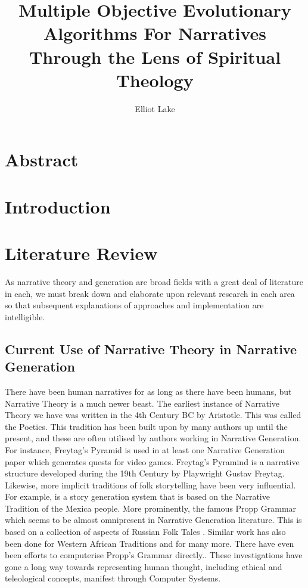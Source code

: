 \documentclass[12pt]{article}
\author{Elliot Lake}
\title{Multiple Objective Evolutionary Algorithms For Narratives Through the Lens of Spiritual Theology}
\begin{document}
\maketitle

\section{Abstract}

\section{Introduction}

\section{Literature Review}
As narrative theory and generation are broad fields with a great deal of literature in each, we must break down and elaborate upon relevant research in each area so that subsequent explanations of approaches and implementation are intelligible.

\subsection{Current Use of Narrative Theory in Narrative Generation}
There have been human narratives for as long as there have been humans, but Narrative Theory is a much newer beast. The earliest instance of Narrative Theory we have was written in the 4th Century BC by Aristotle. This was called the Poetics. This tradition has been built upon by many authors up until the present, and these are often utilised by authors working in Narrative Generation.  For instance, Freytag's Pyramid is used in at least one Narrative Generation paper which generates quests for video games\cite{questgeneration}.  Freytag's Pyramind is a narrative structure developed during the 19th Century by Playwright Gustav Freytag. Likewise, more implicit traditions of folk storytelling have been very influential. For example, \cite{MEXICA} is a story generation system that is based on the Narrative Tradition of the Mexica people. More prominently, the famous Propp Grammar which seems to be almost omnipresent in Narrative Generation literature. This is based on a collection of aspects of Russian Folk Tales \cite{propp1975morphology}. Similar work has also been done for Western African Traditions \cite{WestAfricanGeneration} and for many more.  There have even been efforts to computerise Propp's Grammar directly.\cite{Gervs2013ProppsMO}. These investigations have gone a long way towards representing human thought, including ethical and teleological concepts, manifest through Computer Systems. \\
\end{document}
